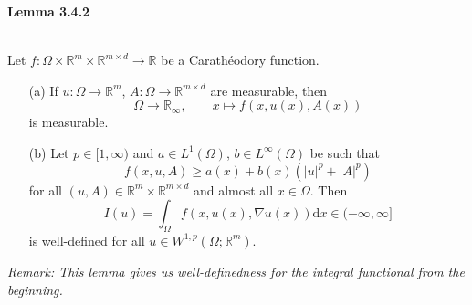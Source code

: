\hypertarget{lemma_3_4_2}{\textbf{Lemma 3.4.2}}\\
Let $f:\Omega\times\mathbb{R}^m\times\mathbb{R}^{m\times d}\longrightarrow\mathbb{R}$ be a Carath\'eodory function.
\begin{itemize}
	\item[(a)] If $u:\Omega\longrightarrow\mathbb{R}^m$, $A:\Omega\longrightarrow\mathbb{R}^{m\times d}$ are measurable, then
	\[\Omega\longrightarrow\mathbb{R}_\infty,\qquad x\longmapsto f(x,u(x),A(x))\]
	is measurable.
	\item[(b)] Let $p\in[1,\infty)$ and $a\in L^1(\Omega)$, $b\in L^\infty(\Omega)$ be such that
	\[f(x,u,A)\geq a(x)+b(x)(\lvert u\rvert^p+\lvert A\rvert^p)\]
	for all $(u,A)\in\mathbb{R}^m\times\mathbb{R}^{m\times d}$ and almost all $x\in\Omega$. Then
	\[I(u)=\int_\Omega{f(x,u(x),\nabla u(x))\mathrm{d}x}\in(-\infty,\infty]\]
	is well-defined for all $u\in W^{1,p}(\Omega;\mathbb{R}^m)$.\\
\end{itemize}

\textit{Remark: This lemma gives us well-definedness for the integral functional from the beginning.}\\

